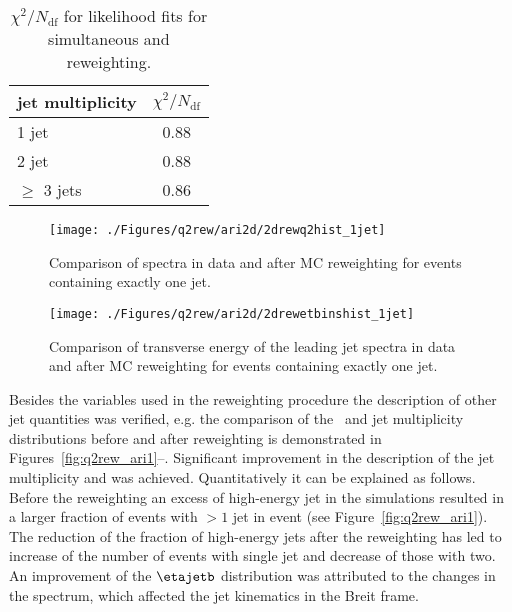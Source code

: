 \begin{table}%
\begin{center}
\begin{tabular}{l|c}
jet multiplicity & $\chi^2/N_\text{df}$ \\
\hline
1 jet & 0.88 \\
2 jet & 0.88 \\
$\geq$ 3 jets & 0.86 \\
\end{tabular}
\end{center}
\caption{$\chi^2/N_\text{df}$ for likelihood fits for simultaneous \qsq and \etjetb reweighting.}
\label{tab:chi2q2ariadnerew}
\end{table}

\begin{figure}[t!]%
\centering
\texttt{[image: ./Figures/q2rew/ari2d/2drewq2hist\_1jet]}%
\caption{Comparison of \qsq spectra in data and \ariadne after MC reweighting for events containing exactly one jet.}%
\label{fig:2dq2rew_q2_1jet}%
\end{figure}

\begin{figure}[p]%
\centering
\texttt{[image: ./Figures/q2rew/ari2d/2drewetbinshist\_1jet]}%
\caption{Comparison of transverse energy of the leading jet spectra in data and \ariadne after MC reweighting for events containing exactly one jet.}%
\label{fig:2dq2rew_et_1jet}%
\end{figure}

Besides the variables used in the reweighting procedure the description of other jet quantities was verified, e.g. the comparison of the \etajetb~and jet multiplicity distributions before and after reweighting is demonstrated in Figures~\ref{fig:q2rew_ari1}--. Significant improvement in the description of the jet multiplicity and \etajetb was achieved. Quantitatively it can be explained as follows. Before the reweighting an excess of high-energy jet in the simulations resulted in a larger fraction of events with $> 1$ jet in event (see Figure~\ref{fig:q2rew_ari1}). The reduction of the fraction of high-energy jets after the reweighting has led to increase of the number of events with single jet and decrease of those with two. An improvement of the $\etajetb$ distribution was attributed to the changes in the \qsq spectrum, which affected the jet kinematics in the Breit frame.

